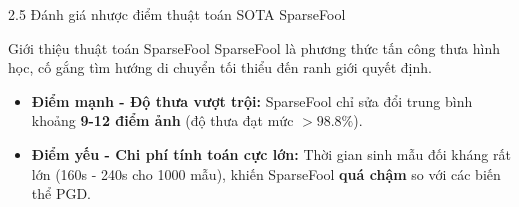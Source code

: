 \documentclass[10pt, xcolor=table]{beamer}
\begin{document}
\begin{frame}{2.5 Đánh giá nhược điểm thuật toán SOTA SparseFool}
    \begin{block}{Giới thiệu thuật toán SparseFool}
        SparseFool là phương thức tấn công thưa hình học, cố gắng tìm hướng di chuyển tối thiểu đến ranh giới quyết định.
    \end{block}
    \centering
    \vspace{0.2cm}
    \begin{itemize}
        \item \textbf{Điểm mạnh - Độ thưa vượt trội:} SparseFool chỉ sửa đổi trung bình khoảng \textbf{9-12 điểm ảnh} (độ thưa đạt mức $>98.8\%$).
        \item \textbf{Điểm yếu - Chi phí tính toán cực lớn:} Thời gian sinh mẫu đối kháng rất lớn (160s - 240s cho 1000 mẫu), khiến SparseFool \textbf{quá chậm} so với các biến thể PGD.
    \end{itemize}
\end{frame}
\end{document}

